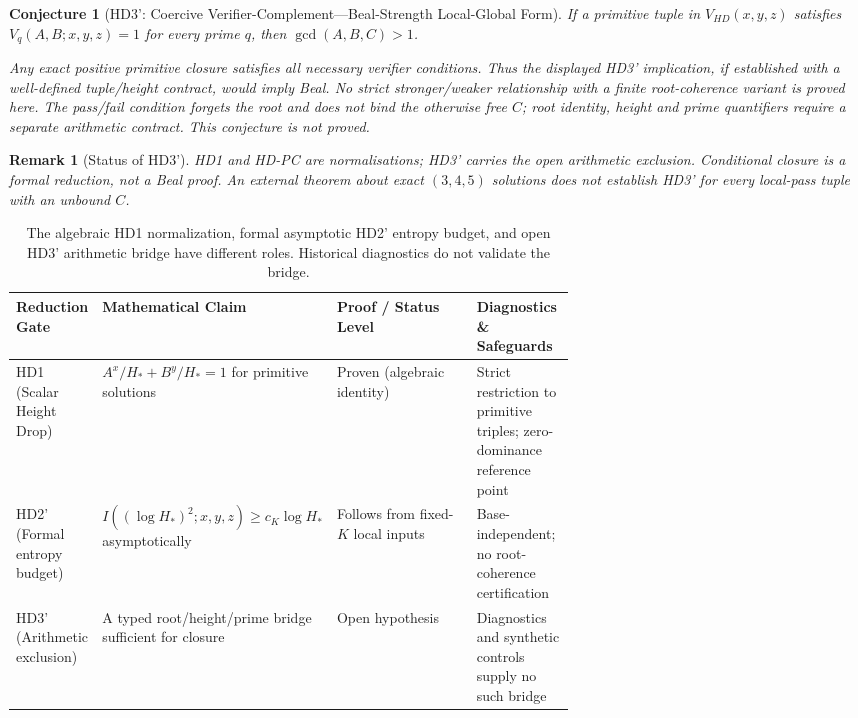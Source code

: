 \documentclass[11pt,a4paper]{article}
\newtheorem{conjecture}[theorem]{Conjecture}
\newtheorem{remark}[theorem]{Remark}
\begin{document}
\begin{conjecture}[HD3': Coercive Verifier-Complement---Beal-Strength Local-Global Form]
\label{conj:hd3prime}
If a primitive tuple in $V_{HD}(x,y,z)$ satisfies $V_q(A,B;x,y,z)=1$
for every prime $q$, then $\gcd(A,B,C)>1$.

Any exact positive primitive closure satisfies all necessary verifier
conditions. Thus the displayed HD3' implication, if established with a
well-defined tuple/height contract, would imply Beal. No strict stronger/weaker
relationship with a finite root-coherence variant is proved here.
The pass/fail condition forgets the root and does not bind the otherwise
free $C$; root identity, height and prime quantifiers require a separate
arithmetic contract. This conjecture is not proved.
\end{conjecture}
\begin{remark}[Status of HD3']
HD1 and HD-PC are normalisations; HD3' carries the open arithmetic
exclusion. Conditional closure is a formal reduction, not a Beal proof.
An external theorem about exact $(3,4,5)$ solutions does not establish
HD3' for every local-pass tuple with an unbound $C$.
\end{remark}

\begin{table}[htb]
\centering
\small
\begin{tabularx}{\textwidth}{@{} >{\raggedright\arraybackslash}p{0.15\linewidth} >{\raggedright\arraybackslash}p{0.25\linewidth} >{\raggedright\arraybackslash}p{0.25\linewidth} >{\raggedright\arraybackslash}X @{}}
\toprule
Reduction Gate & Mathematical Claim & Proof / Status Level & Diagnostics \& Safeguards \\
\midrule
HD1 (Scalar Height Drop) & $A^x/H_* + B^y/H_* = 1$ for primitive solutions & Proven (algebraic identity) & Strict restriction to primitive triples; zero-dominance reference point \\
\addlinespace
HD2' (Formal entropy budget) & $I((\log H_*)^2;x,y,z)\ge c_K\log H_*$ asymptotically & Follows from fixed-$K$ local inputs & Base-independent; no root-coherence certification \\
\addlinespace
HD3' (Arithmetic exclusion) & A typed root/height/prime bridge sufficient for closure & Open hypothesis & Diagnostics and synthetic controls supply no such bridge \\
\bottomrule
\end{tabularx}
\caption{The algebraic HD1 normalization, formal asymptotic HD2' entropy budget, and open HD3' arithmetic bridge have different roles. Historical diagnostics do not validate the bridge.}
\label{tab:reduction_matrix}
\end{table}
\end{document}
